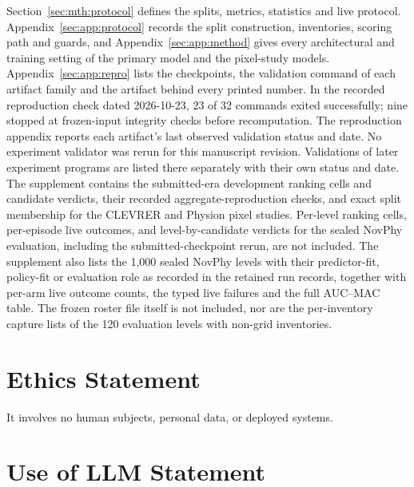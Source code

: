 \begin{revblock}
Section~\ref{sec:mth:protocol} defines the splits, metrics, statistics and live protocol. Appendix~\ref{sec:app:protocol} records the split construction, inventories, scoring path and guards, and Appendix~\ref{sec:app:method} gives every architectural and training setting of the primary model and the pixel-study models. Appendix~\ref{sec:app:repro} lists the checkpoints, the validation command of each artifact family and the artifact behind every printed number. In the recorded reproduction check dated 2026-10-23, 23 of 32 commands exited successfully; nine stopped at frozen-input integrity checks before recomputation. The reproduction appendix reports each artifact's last observed validation status and date. No experiment validator was rerun for this manuscript revision. Validations of later experiment programs are listed there separately with their own status and date. The supplement contains the submitted-era development ranking cells and candidate verdicts, their recorded aggregate-reproduction checks, and exact split membership for the CLEVRER and Physion pixel studies. Per-level ranking cells, per-episode live outcomes, and level-by-candidate verdicts for the sealed NovPhy evaluation, including the submitted-checkpoint rerun, are not included. The supplement also lists the 1,000 sealed NovPhy levels with their predictor-fit, policy-fit or evaluation role as recorded in the retained run records, together with per-arm live outcome counts, the typed live failures and the full AUC--MAC table. The frozen roster file itself is not included, nor are the per-inventory capture lists of the 120 evaluation levels with non-grid inventories.
\end{revblock}

\section{Ethics Statement}
 It involves no human subjects, personal data, or deployed systems.

\section{Use of LLM Statement}
\label{app:llm-usage}

